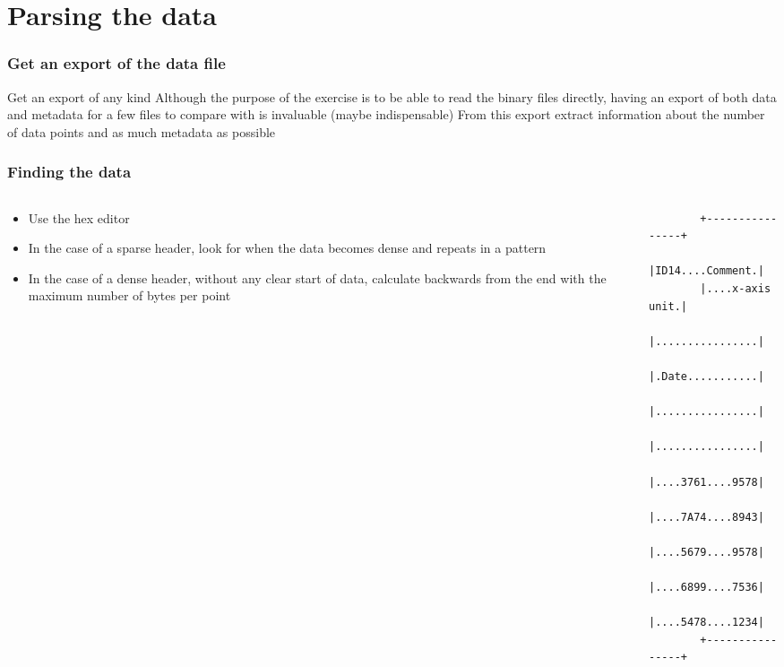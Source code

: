 \documentclass{beamer}
\begin{document}
\section{Parsing the data}

\begin{frame}
  \frametitle{Get an export of the data file}
  \begin{alertblock}{Get an export of any kind}
    Although the purpose of the exercise is to be able to read the
    binary files directly, having an export of both data and metadata
    for a few files to compare with is invaluable (maybe
    indispensable)\newline
    \newline
    From this export extract information about the number of data points
    and as much metadata as possible
  \end{alertblock}
\end{frame}


\begin{frame}[fragile]
  \frametitle{Finding the data}
  \begin{columns}[onlytextwidth]
    \begin{column}{0.5\textwidth}
      \begin{itemize}
      \item Use the hex editor
      \item In the case of a sparse header, look for when the data becomes
        dense and repeats in a pattern
      \item In the case of a dense header, without any clear start of
        data, calculate backwards from the end with the maximum number of
        bytes per point
      \end{itemize}
    \end{column}
    \begin{column}{0.5\textwidth}
      \begin{verbatim}
        +----------------+
        |ID14....Comment.|
        |....x-axis unit.|
        |................|
        |.Date...........|
        |................|
        |................|
        |....3761....9578|
        |....7A74....8943|
        |....5679....9578|
        |....6899....7536|
        |....5478....1234|
        +----------------+
      \end{verbatim}
    \end{column}
  \end{columns}
\end{frame}
\end{document}

